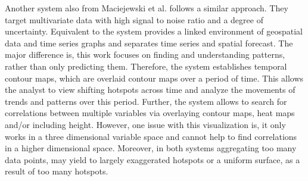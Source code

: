 \documentclass[electronic]{vgtc}             %
\begin{document}
Another system also from Maciejewski et al. \cite{maciejewski:2010} follows a similar approach.
They target multivariate data with high signal to noise ratio and a degree of uncertainty.
Equivalent to \cite{maciejewski:2011} the system provides a linked environment of geospatial data and time series graphs and separates time series and spatial forecast.
The major difference is, this work focuses on finding and understanding patterns, rather than only predicting them.
Therefore, the system establishes temporal contour maps, which are overlaid contour maps over a period of time. 
This allows the analyst to view shifting hotspots across time and analyze the movements of trends and patterns over this period.
Further, the system allows to search for correlations between multiple variables via overlaying contour maps, heat maps and/or including height. 
However, one issue with this visualization is, it only works in a three dimensional variable space and cannot help to find correlations in a higher dimensional space. 
Moreover, in both systems aggregating too many data points, may yield to largely exaggerated hotspots or a uniform surface, as a result of too many hotspots. 
\end{document}
